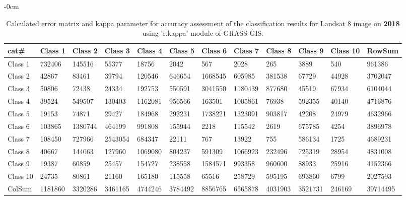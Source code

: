 \documentclass[analytics,article,submit,pdftex,moreauthors]{Definitions/mdpi}
\begin{document}
\begin{table}[H] 
\footnotesize
    \centering
    \begin{adjustwidth}{-\extralength}{0cm}
    \caption{Calculated error matrix and kappa parameter for accuracy assessment of the classification results for Landsat 8 image on \textbf{2018} using 'r.kappa' module of GRASS GIS.\label{tab03}}
 	\begin{tabularx}{\fulllength}{|l|l|l|l|l|l|l|l|l|l|l|l|}
    \toprule
         cat\# & \textbf{Class 1} & \textbf{Class 2} & \textbf{Class 3} & \textbf{Class 4} & \textbf{Class 5} & \textbf{Class 6} & \textbf{Class 7} & \textbf{Class 8} & \textbf{Class 9} & \textbf{Class 10} & \textbf{RowSum} \\ \hline
        Class 1 & \cellcolor{green!10}732406 & 145516 & 55377 & 18756 & 2042 & 567 & 2028 & 265 & 3889 & 540 & 961386 \\ \hline
        Class 2 & 42867 & \cellcolor{green!10}83461 & 39794 & 120546 & 646654 & 1668545 & 605985 & 381538 & 67729 & 44928 & 3702047 \\ \hline
        Class 3 & 50806 & 72438 & \cellcolor{green!10}24334 & 192753 & 550591 & 3041550 & 1180439 & 877680 & 45519 & 67934 & 6104044 \\ \hline
        Class 4 & 39524 & 549507 & 130403 & \cellcolor{green!10}1162081 & 956566 & 163501 & 1005861 & 76938 & 592355 & 40140 & 4716876 \\ \hline
        Class 5 & 19153 & 74871 & 29427 & 184968 & \cellcolor{green!10}292231 & 1738221 & 1323091 & 903817 & 42208 & 24979 & 4632966 \\ \hline
        Class 6 & 103865 & 1380744 & 464199 & 991808 & 155944 & \cellcolor{green!10}2218 & 115542 & 2619 & 675785 & 4254 & 3896978 \\ \hline
        Class 7 & 108450 & 727966 & 2543054 & 684347 & 22111 & 767 & \cellcolor{green!10}13922 & 755 & 586134 & 1725 & 4689231 \\ \hline
        Class 8 & 40667 & 144063 & 127960 & 1069080 & 804237 & 591309 & 1066923 & \cellcolor{green!10}232496 & 725319 & 28954 & 4831008 \\ \hline
        Class 9 & 19387 & 60859 & 25457 & 154727 & 238558 & 1584571 & 993358 & 960600 & \cellcolor{green!10}88933 & 25916 & 4152366 \\ \hline
        Class 10 & 24735 & 80861 & 21160 & 165180 & 115558 & 65516 & 258729 & 595195 & 693860 & \cellcolor{green!10}6799 & 2027593 \\ \hline
        ColSum & 1181860 & 3320286 & 3461165 & 4744246 & 3784492 & 8856765 & 6565878 & 4031903 & 3521731 & 246169 & \cellcolor{green!10}39714495 \\ \hline
        \bottomrule
    \end{tabularx}
    \end{adjustwidth}
\end{table}
\end{document}
